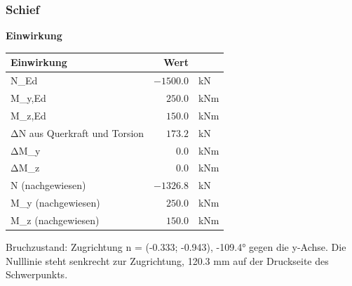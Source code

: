 \documentclass[11pt,a4paper]{article}
\begin{document}
\subsubsection{Schief}
\noindent\textbf{Einwirkung}
\begin{longtable}{lrl}
\hline
Einwirkung & Wert &  \\
\hline
\endhead
N\_Ed & $-1500.0$ & kN \\
M\_y,Ed & $250.0$ & kNm \\
M\_z,Ed & $150.0$ & kNm \\
ΔN aus Querkraft und Torsion & $173.2$ & kN \\
ΔM\_y & $0.0$ & kNm \\
ΔM\_z & $0.0$ & kNm \\
N (nachgewiesen) & $-1326.8$ & kN \\
M\_y (nachgewiesen) & $250.0$ & kNm \\
M\_z (nachgewiesen) & $150.0$ & kNm \\
\hline
\end{longtable}
Bruchzustand: Zugrichtung n = (-0.333; -0.943), -109.4° gegen die y-Achse. Die Nulllinie steht senkrecht zur Zugrichtung, 120.3 mm auf der Druckseite des Schwerpunkts.
\end{document}
